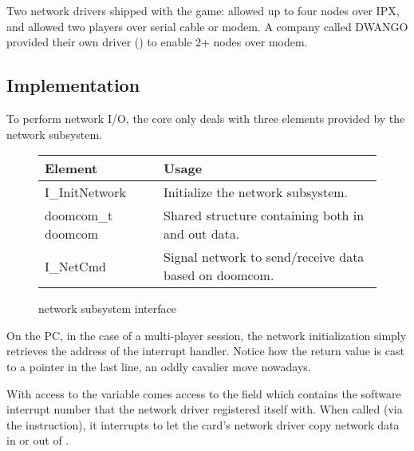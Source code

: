 Two network drivers shipped with the game:  allowed up to four nodes over IPX, and  allowed two players over serial cable or modem. A company called DWANGO provided their own driver () to enable 2+ nodes over modem.





\vspace{-5pt}
\subsection{Implementation}
To perform network I/O, the core only deals with three elements provided by the network subsystem.\\
\par
 \begin{figure}[H]
\centering  
\begin{tabularx}{\textwidth}{ L{0.6}  L{1.4}}
  \toprule
  \textbf{Element} &  \textbf{Usage}\\

  \toprule 
   I\_InitNetwork & Initialize the network subsystem.\\
   doomcom\_t doomcom & Shared structure containing both in and out data.\\
   I\_NetCmd & Signal network to send/receive data based on doomcom.\\
   \toprule
\end{tabularx}
\caption{\doom{} network subsystem interface}
\end{figure}


\vspace{-10pt}
On the PC, in the case of a multi-player session, the network initialization simply retrieves the address of the interrupt handler. Notice how the  return value is cast to a pointer in the last line, an oddly cavalier move nowadays.\\
\par











With access to the  variable comes access to the field  which contains the software interrupt number that the \doom{} network driver registered itself with. When called (via the  instruction), it interrupts \doom{} to let the card's network driver copy network data in or out of .\\



